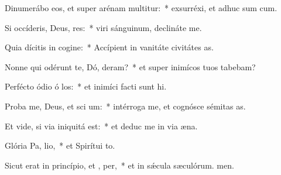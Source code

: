 \item Dinumerábo eos, et super arénam multitur:~* exsurréxi, et adhuc sum cum.
\item Si occíderis, Deus, res:~* viri sánguinum, declináte  me.
\item Quia dícitis in cogine:~* Accípient in vanitáte civitátes as.
\item Nonne qui odérunt te, Dó, deram?~* et super inimícos tuos tabebam?
\item Perfécto ódio ó los:~* et inimíci facti sunt hi.
\item Proba me, Deus, et sci  um:~* intérroga me, et cognósce sémitas as.
\item Et vide, si via iniquitá   est:~* et deduc me in via æna.
\item Glória Pa,  lio,~* et Spirítui to.
\item Sicut erat in princípio, et ,  per,~* et in sǽcula sæculórum. men.
